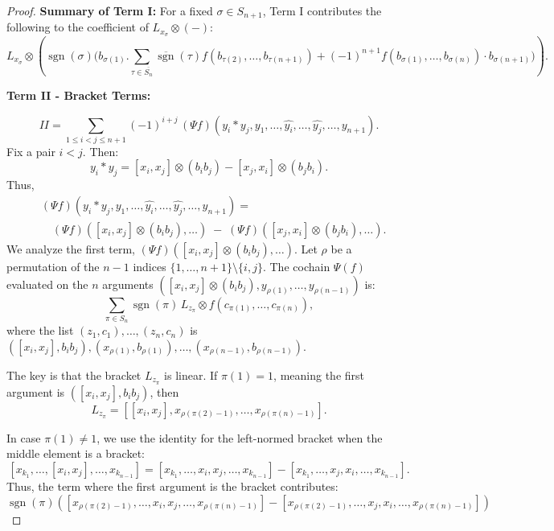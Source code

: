 \documentclass[a4paper, 12pt,oneside,reqno]{amsart}
\begin{document}
\begin{proof}
\textbf{Summary of Term I:}
For a fixed \(\sigma \in S_{n+1}\), Term I contributes the following to the coefficient of \(L_{x_\sigma} \otimes (-)\):
\[
L_{x_\sigma} \otimes \left(\operatorname{sgn}(\sigma) \Big( b_{\sigma(1)}.  \sum_{\tau \in \overline{S_{n}}}\overline{\operatorname{sgn}}(\tau)f(b_{\tau(2)}, \dots, b_{\tau(n+1)})+ (-1)^{n+1} f(b_{\sigma(1)}, \dots, b_{\sigma(n)}) \cdot b_{\sigma(n+1)} \Big) \right). \tag{I}
\]




\textbf{ Term II - Bracket Terms:}

\[
II = \sum_{1 \leq i < j \leq n+1} (-1)^{i+j} \, (\Psi f)(y_i \ast y_j, y_1, \dots, \widehat{y_i}, \dots, \widehat{y_j}, \dots, y_{n+1}).
\]
Fix a pair \(i < j\). Then:
\[
y_i \ast y_j = [x_i, x_j] \otimes (b_i b_j) - [x_j, x_i] \otimes (b_j b_i).
\]
Thus,
\[
\begin{aligned}
&(\Psi f)(y_i \ast y_j, y_1, \dots, \widehat{y_i}, \dots, \widehat{y_j}, \dots, y_{n+1}) = \\
&\quad (\Psi f)([x_i, x_j] \otimes (b_i b_j), \dots) \;-\; (\Psi f)([x_j, x_i] \otimes (b_j b_i), \dots).
\end{aligned}
\]
We analyze the first term, \((\Psi f)([x_i, x_j] \otimes (b_i b_j), \dots)\). Let \(\rho\) be a permutation of the \(n-1\) indices \(\{1, \dots, n+1\} \setminus \{i, j\}\). The cochain \(\Psi(f)\) evaluated on the \(n\) arguments \(([x_i, x_j] \otimes (b_i b_j), y_{\rho(1)}, \dots, y_{\rho(n-1)})\) is:
\[
\sum_{\pi \in S_n} \operatorname{sgn}(\pi) \, L_{z_\pi} \otimes f(c_{\pi(1)}, \dots, c_{\pi(n)}),
\]
where the list \((z_1, c_1), \dots, (z_n, c_n)\) is \(([x_i, x_j], b_i b_j), (x_{\rho(1)}, b_{\rho(1)}), \dots, (x_{\rho(n-1)}, b_{\rho(n-1)})\).

The key is that the bracket \(L_{z_\pi}\) is linear. If \(\pi(1) = 1\), meaning the first argument is \(([x_i, x_j], b_i b_j)\), then
\[
L_{z_\pi} = [[x_i, x_j], x_{\rho(\pi(2)-1)}, \dots, x_{\rho(\pi(n)-1)}].
\]

















 In case  \(\pi(1) \neq 1\), we use the identity for the left-normed bracket when the middle element is a bracket:
\[
[ x_{k_1}, \dots,[x_i, x_j],\dots, x_{k_{n-1}}] = [ x_{k_1}, \dots, x_i,x_j,\dots, x_{k_{n-1}}] - [ x_{k_1}, \dots, x_j,x_i,\dots, x_{k_{n-1}}].
\]
Thus, the term where the first argument is the bracket contributes:
\[
\operatorname{sgn}(\pi) \left( [ x_{\rho(\pi(2)-1)}, \dots,x_i, x_j, \dots, x_{\rho(\pi(n)-1)}] - [ x_{\rho(\pi(2)-1)}, \dots, x_j, x_i,\dots, x_{\rho(\pi(n)-1)}] \right)
\]


\end{proof}
\end{document}
